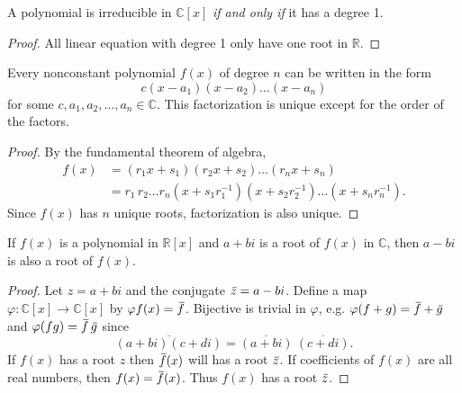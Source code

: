 \begin{corollary}
    A polynomial is irreducible in $\mathbb{C}[x]$ \textit{if and only if} it has a degree 1.
\end{corollary}
\begin{proof}
    All linear equation with degree 1 only have one root in $\mathbb{R}$.
\end{proof}

\begin{corollary}
    Every nonconstant polynomial $f(x)$ of degree $n$ can be written in the form 
    \[
        c(x-a_1)(x-a_2) \ldots (x-a_n)
    \]
    for some $c, a_1, a_2, \ldots, a_n \in \mathbb{C}$. This factorization is unique except for the order 
    of the factors.
\end{corollary}
\begin{proof}
    By the fundamental theorem of algebra, 
    \begin{align*}
        f(x) &= (r_1x + s_1)(r_2x + s_2) \ldots (r_nx + s_n)\\
        &= r_1\, r_2 \ldots r_n (x + s_1r_1^{-1})(x + s_2r^{-1}_2) \ldots (x + s_nr^{-1}_n).
    \end{align*}
    Since $f(x)$ has $n$ unique roots, factorization is also unique.
\end{proof}

\begin{lemma}
    If $f(x)$ is a polynomial in $\mathbb{R}[x]$ and $a + bi$ is a root of $f(x)$ in $\mathbb{C}$, 
    then $a - bi$ is also a root of $f(x)$.
\end{lemma}
\begin{proof}
    Let $z = a+bi$ and the conjugate $\,\overline{\!{z}} = a - bi$. Define a map 
    $\varphi: \mathbb{C}[x] \to \mathbb{C}[x]$ by $\varphi f(x) = \,\overline{\!{f}}$. 
    Bijective is trivial in $\varphi$, e.g.
        $\varphi(f + g) = \,\overline{\!{f}} + \,\overline{\!{g}}$
    and $\varphi(fg)= \,\overline{\!{f}} \, \,\overline{\!{g}}$ since 
    \[
        \overline{(a+bi)(c+di)} = \overline{(a+bi)}\> \overline{(c+di)}.
    \]
    If $f(x)$ has a root $z$ then $\,\overline{\!{f}}(x)$ will has a root $\,\overline{\!{z}}$. 
    If coefficients of $f(x)$ are all real numbers, then $f(x) = \,\overline{\!{f}}(x)$. 
    Thus $f(x)$ has a root $\,\overline{\!{z}}$.
\end{proof}


